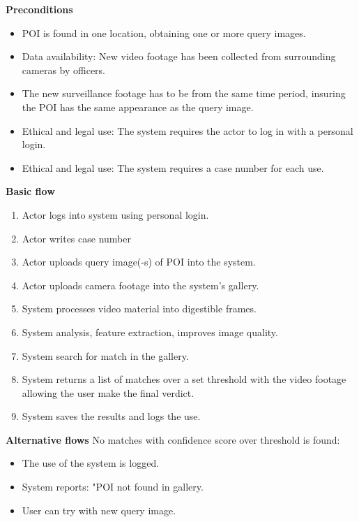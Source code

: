 \vspace{1em}

\noindent\textbf{Preconditions}
\begin{itemize}
    \item \acs{POI} is found in one location, obtaining one or more query images.
    \item Data availability: New video footage has been collected from surrounding cameras by officers.
    \item The new surveillance footage has to be from the same time period, insuring the \acs{POI} has the same appearance as the query image.
    \item Ethical and legal use: The system requires the actor to log in with a personal login.
    \item Ethical and legal use: The system requires a case number for each use.
\end{itemize}
\vspace{1em}

\noindent\textbf{Basic flow}
\begin{enumerate}
\item  Actor logs into system using personal login.
\item Actor writes case number
\item Actor uploads query image(-s) of \acs{POI} into the system.
\item Actor uploads camera footage into the system's gallery.
\item System processes video material into digestible frames.
\item System analysis, feature extraction, improves image quality.
\item System search for match in the gallery.
\item System returns a list of matches over a set threshold with the video footage allowing the user make the final verdict.
\item System saves the results and logs the use.
\end{enumerate}
\vspace{1em}

\noindent\textbf{Alternative flows}
No matches with confidence score over threshold is found: 
\begin{itemize}
\item The use of the system is logged.
        \item  System reports: "\ac{POI} not found in gallery.
        \item User can try with new query image.
    \end{itemize}
\vspace{1em}

